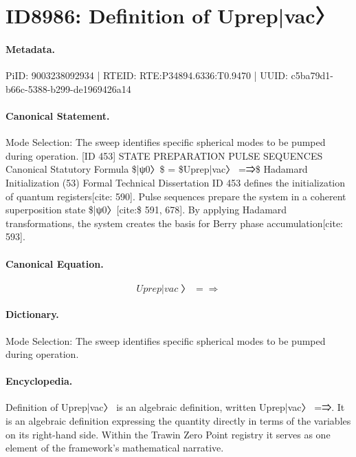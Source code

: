 \section*{ID8986: Definition of Uprep|vac〉}
\paragraph{Metadata.}
PiID: 9003238092934 | RTEID: RTE:P34894.6336:T0.9470 | UUID: c5ba79d1-b66c-5388-b299-de1969426a14

\paragraph{Canonical Statement.}
Mode Selection: The sweep identifies specific spherical modes to be pumped during operation. [ID 453] STATE PREPARATION PULSE SEQUENCES Canonical Statutory Formula \$|ψ0〉\$ = \$Uprep|vac〉 =⇒\$ Hadamard Initialization (53) Formal Technical Dissertation ID 453 defines the initialization of quantum registers[cite: 590]. Pulse sequences prepare the system in a coherent superposition state \$|ψ0〉[cite:\$ 591, 678]. By applying Hadamard transformations, the system creates the basis for Berry phase accumulation[cite: 593].

\paragraph{Canonical Equation.}
\[
Uprep|vac〉 =⇒
\]

\paragraph{Dictionary.}
Mode Selection: The sweep identifies specific spherical modes to be pumped during operation.

\paragraph{Encyclopedia.}
Definition of Uprep|vac〉 is an algebraic definition, written Uprep|vac〉 =⇒. It is an algebraic definition expressing the quantity directly in terms of the variables on its right-hand side. Within the Trawin Zero Point registry it serves as one element of the framework's mathematical narrative.
